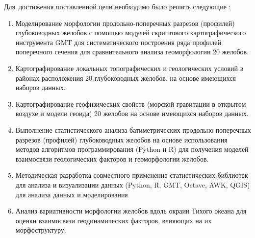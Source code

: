 Для~достижения поставленной цели необходимо было решить следующие {\tasks}:
\begin{enumerate}[label=\Roman*.]%
  \item Моделирование морфологии продольно-поперечных разрезов (профилей) глубоководных желобов с помощью модулей скриптового картографического инструмента GMT для систематического построения ряда профилей поперечного сечения для сравнительного анализа геоморфологии 20 желобов.
  \item Картографирование локальных топографических и геологических условий в районах расположения 20 глубоководных желобов, на основе имеющихся наборов данных.
  \item Картографирование геофизических свойств (морской гравитации в открытом воздухе и модели геоида) 20 желобов на основе имеющихся наборов данных. 
  \item Выполнение статистического анализа батиметрических продольно-поперечных разрезов (профилей) глубоководных желобов на основе использования методов алгоритмов программирования (Python и R) для получения моделей взаимосвязи геологических факторов и геоморфологии желобов.
  \item Методическая разработка совместного применение статистических библиотек для анализа и визуализации данных (Python, R, GMT, Octave, AWK, QGIS) для анализа данных и моделирования
  \item Анализ вариативности морфологии желобов вдоль окраин Тихого океана для оценки взаимосвязи геодинамических факторов, влияющих на их морфоструктуру. 
\end{enumerate}

